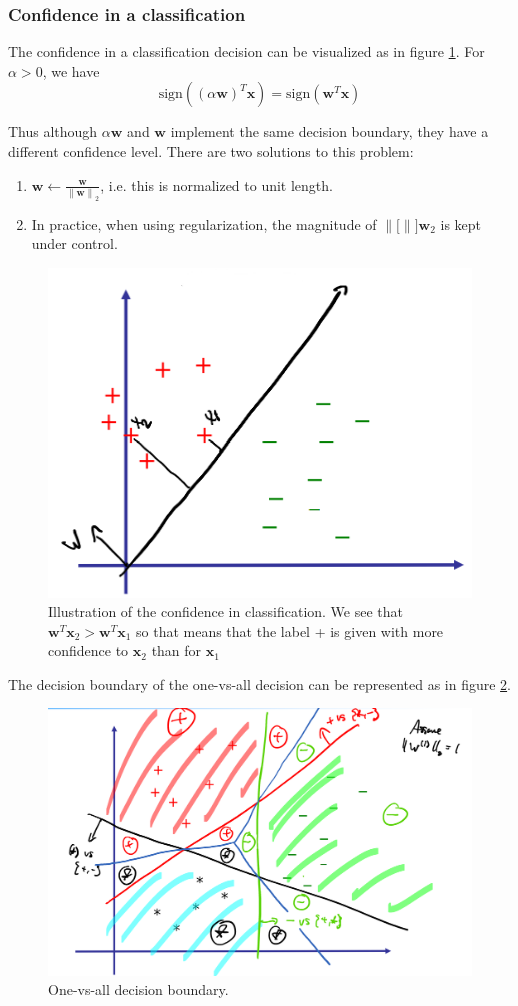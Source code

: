 \documentclass[a4paper,10pt,twoside]{article}
\newcommand\norm[1]{\left\lVert#1\right\rVert}
\begin{document}
\subsubsection{Confidence in a classification}

The confidence in a classification decision can be visualized as in figure \ref{confidence-in-classification}. For $\alpha>0$, we have 
\begin{equation*}
    \text{sign}((\alpha\mathbf{w})^T\mathbf{x})=\text{sign}(\mathbf{w}^T\mathbf{x})
\end{equation*}

Thus although $\alpha\mathbf{w}$ and $\mathbf{w}$ implement the same decision boundary, they have a different confidence level. There are two solutions to this problem: 
\begin{enumerate}
    \item $\mathbf{w}\leftarrow \frac{\mathbf{w}}{\norm{\mathbf{w}}_2}$, i.e. this is normalized to unit length.
    \item In practice, when using regularization, the magnitude of $\norm[]{\mathbf{w}}_2$ is kept under control. 
\end{enumerate} 

\begin{figure}
    \centering
    \includegraphics[width=.5\textwidth]{figures/confidence-in-classification.png}
    \caption{Illustration of the confidence in classification. We see that $\mathbf{w}^T\mathbf{x}_2>\mathbf{w}^T\mathbf{x}_1$ so that means that the label + is given with more confidence to $\mathbf{x}_2$ than for $\mathbf{x}_1$}
    \label{confidence-in-classification}
\end{figure}

The decision boundary of the one-vs-all decision can be represented as in figure \ref{ova-decision-boundary}. 

\begin{figure}
    \centering
    \includegraphics[width=.5\textwidth]{figures/ova-decision-boundary.png}
    \caption{One-vs-all decision boundary.}
    \label{ova-decision-boundary}
\end{figure}
\end{document}
